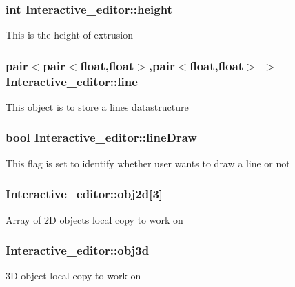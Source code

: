\subsubsection[{\texorpdfstring{height}{height}}]{\setlength{\rightskip}{0pt plus 5cm}int Interactive\+\_\+editor\+::height}\hypertarget{classInteractive__editor_aced5ec777fe62fb280f3668a1c59f9b7}{}\label{classInteractive__editor_aced5ec777fe62fb280f3668a1c59f9b7}
This is the height of extrusion 
\subsubsection[{\texorpdfstring{line}{line}}]{\setlength{\rightskip}{0pt plus 5cm}pair$<$pair$<$float,float$>$,pair$<$float,float$>$ $>$ Interactive\+\_\+editor\+::line}\hypertarget{classInteractive__editor_ab12d018a266f71e228845e7ae5bd2181}{}\label{classInteractive__editor_ab12d018a266f71e228845e7ae5bd2181}
This object is to store a line\textquotesingle{}s datastructure 
\subsubsection[{\texorpdfstring{line\+Draw}{lineDraw}}]{\setlength{\rightskip}{0pt plus 5cm}bool Interactive\+\_\+editor\+::line\+Draw}\hypertarget{classInteractive__editor_aa0de8abac09ce2259252fba6c1958e83}{}\label{classInteractive__editor_aa0de8abac09ce2259252fba6c1958e83}
This flag is set to identify whether user wants to draw a line or not 
\subsubsection[{\texorpdfstring{obj2d}{obj2d}}]{ Interactive\+\_\+editor\+::obj2d\mbox{[}3\mbox{]}}\hypertarget{classInteractive__editor_a0974df86dfc8021afda1fcc07907671a}{}\label{classInteractive__editor_a0974df86dfc8021afda1fcc07907671a}
Array of 2D objects local copy to work on 
\subsubsection[{\texorpdfstring{obj3d}{obj3d}}]{ Interactive\+\_\+editor\+::obj3d}\hypertarget{classInteractive__editor_ab0a5452e01c787797bad0624452bf555}{}\label{classInteractive__editor_ab0a5452e01c787797bad0624452bf555}
3D object local copy to work on 
